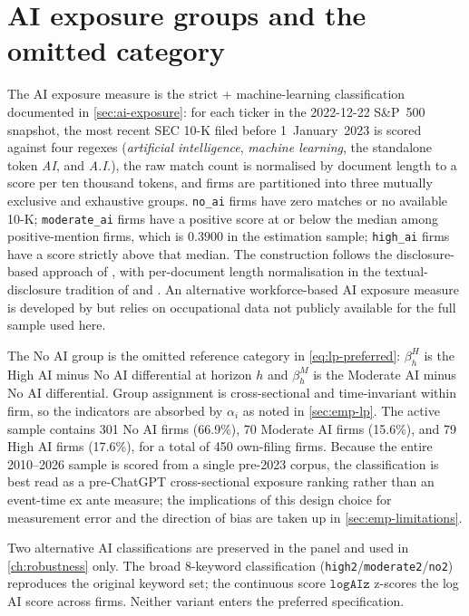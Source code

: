 \section{AI exposure groups and the omitted category}
\label{sec:emp-ai}

The AI exposure measure is the strict + machine-learning classification documented in \cref{sec:ai-exposure}: for each ticker in the 2022-12-22 S\&P~500 snapshot, the most recent SEC 10-K filed before 1~January~2023 is scored against four regexes (\textit{artificial intelligence}, \textit{machine learning}, the standalone token \textit{AI}, and \textit{A.I.}), the raw match count is normalised by document length to a score per ten thousand tokens, and firms are partitioned into three mutually exclusive and exhaustive groups. \texttt{no\_ai} firms have zero matches or no available 10-K; \texttt{moderate\_ai} firms have a positive score at or below the median among positive-mention firms, which is $0.3900$ in the estimation sample; \texttt{high\_ai} firms have a score strictly above that median. The construction follows the disclosure-based approach of \citet{anteSaggu2025}, with per-document length normalisation in the textual-disclosure tradition of \citet{loughranMcDonald2011} and \citet{hobergPhillips2016}. An alternative workforce-based AI exposure measure is developed by \citet{eisfeldtSchubertZhangTaska2023} but relies on occupational data not publicly available for the full sample used here.

The No AI group is the omitted reference category in \eqref{eq:lp-preferred}: $\beta_h^H$ is the High AI minus No AI differential at horizon $h$ and $\beta_h^M$ is the Moderate AI minus No AI differential. Group assignment is cross-sectional and time-invariant within firm, so the indicators are absorbed by $\alpha_i$ as noted in \cref{sec:emp-lp}. The active sample contains 301 No AI firms (66.9\%), 70 Moderate AI firms (15.6\%), and 79 High AI firms (17.6\%), for a total of 450 own-filing firms. Because the entire 2010--2026 sample is scored from a single pre-2023 corpus, the classification is best read as a pre-ChatGPT cross-sectional exposure ranking rather than an event-time ex ante measure; the implications of this design choice for measurement error and the direction of bias are taken up in \cref{sec:emp-limitations}.

Two alternative AI classifications are preserved in the panel and used in \cref{ch:robustness} only. The broad 8-keyword classification (\texttt{high2}/\texttt{moderate2}/\texttt{no2}) reproduces the original keyword set; the continuous score $\mathtt{logAIz}$ z-scores the log AI score across firms. Neither variant enters the preferred specification.

